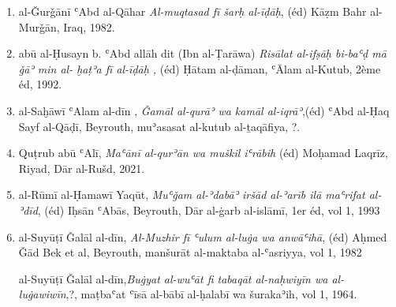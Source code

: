 \documentclass[a4paper,12pt]{report}
\begin{document}
\begin{french}
\begin{enumerate} [III]
\begin{enumerate}
 \textemdash\textemdash al-Fārisī abū ʿAlī,\textit {Kitāb al-šiʿr,} (éd) Maḥmud al-Ṭanāḥī, le Caire, maktabat al-ḫānǧi ,
 1988.

 \textemdash\textemdash  al-Fārisī abū ʿAli, \textit{Kitāb al-takmila,} (éd) Kāẓim Baḥr al-Murǧān, Beyrouth, ʿĀlam al-Kutub,  1999.

 \textemdash\textemdash  al-Fārisī abū ʿAl\=i   , \textit{  ͑Kitāb al-Īḍāḥ}, (éd) Kāẓim Baḥr al-Murǧān, Beyrouth,   ͑ Ālam al-Kutub, 1996.


\textemdash\textemdash  al-Fārisī abū ʿAl\=i \textit{
Al-masāʾil al-šširāziyat},(éd) Ḥasan Handāwī, Riyad,  kunūz išbīlyā li-našr wa tawzīʿ,  2004.
 
 \textemdash \textemdash al-Fārisī abū ʿAl\=i, \textit{al-Taʿlīqa ʿalā  kitāb sībawayh}, (éd) ʿAwaḍ al-Quzī, ? , 1990.
 
 \item  al-Ǧurǧān\=i ʿAbd al-Qāhar
   \textit {Al-muqtasad fī šarḥ al-īḍāḥ}, (éd) Kāẓm Bahr al-Murǧān, Iraq, 1982.

\item abū al-Ḥusayn b. ʿAbd allāh dit (Ibn al-Ṭarāwa) 
   \textit {Risālat al-ifṣāḥ bi-baʿḍ mā ǧāʾ min al- ḫaṭʾa fī al-īḍāḥ ,}
   (éd) Ḥātam al-ḍāman, ʿĀlam al-Kutub, 2ème éd, 1992.


 \item al-Saḫāwī ʿAlam al-dīn  ,\textit { Ǧamāl al-qurāʾ wa kamāl al-iqrāʾ},(éd) ʿAbd al-Ḥaq Sayf al-Qāḍī, Beyrouth, muʾasasat al-kutub al-ṯaqāfiya, ?.
\item Quṭrub  abū  ʿAlī, 
 \textit{Maʿānī al-qurʾān wa muškil iʿrābih} (éd) Moḥamad Laqrīz, Riyad, Dār al-Rušd, 2021.


\item al-Rūmī al-Ḥamawī Yaqūt, \textit{Muʿǧam al-ʾdabāʾ iršād al-ʾarīb ilā maʿrifat al-ʾdīd}, (éd) Iḥsān ʿAbās, Beyrouth, Dār al-ġarb al-islāmī, 1er éd, vol 1, 1993

\item al-Suyūṭī Ǧalāl al-dīn,\textit{ Al-Muzhir fī ʿulum al-luġa wa anwāʿihā}, (éd) Aḥmed Ǧād Bek et al, Beyrouth, manšurāt al-maktaba al-ʿasriyya, vol 1, 1982

 \textemdash\textemdash 
al-Suyūṭī Ǧalāl al-dīn,\textit {Buġyat al-wuʿāt fi tabaqāt al-naḥwiyīn wa al-luġawiwīn},?, maṭbaʿat ʿīsā al-bābī al-ḥalabī wa šurakaʾih, vol 1,  1964.



\end{enumerate}
\end{enumerate}
\end{french}
\end{document}
